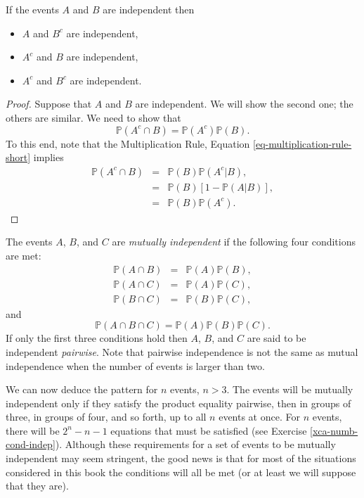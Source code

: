 \documentclass[captions=tableheading]{scrbook}
\begin{document}
\begin{prop}
If the events \(A\) and \(B\) are independent then
\begin{itemize}
\item \(A\) and \(B^{c}\) are independent,
\item \(A^{c}\) and \(B\) are independent,
\item \(A^{c}\) and \(B^{c}\) are independent.
\end{itemize}

\end{prop}

\begin{proof}
Suppose that \(A\) and \(B\) are independent. We will show the second one; the others are similar. We need to show that
\[
\mathbb{P}(A^{c}\cap B)=\mathbb{P}(A^{c})\mathbb{P}(B).
\]
To this end, note that the Multiplication Rule, Equation \ref{eq-multiplication-rule-short} implies 
\begin{eqnarray*}
\mathbb{P}(A^{c}\cap B) & = & \mathbb{P}(B)\mathbb{P}(A^{c}|B),\\
 & = & \mathbb{P}(B)[1-\mathbb{P}(A|B)],\\
 & = & \mathbb{P}(B)\mathbb{P}(A^{c}).
\end{eqnarray*}
\end{proof}

\begin{defn}
The events \(A\), \(B\), and \(C\) are \emph{mutually independent} if the following four conditions are met: 
\begin{eqnarray*}
\mathbb{P}(A\cap B) & = & \mathbb{P}(A)\mathbb{P}(B),\\
\mathbb{P}(A\cap C) & = & \mathbb{P}(A)\mathbb{P}(C),\\
\mathbb{P}(B\cap C) & = & \mathbb{P}(B)\mathbb{P}(C),
\end{eqnarray*}
and
\[
\mathbb{P}(A\cap B\cap C)=\mathbb{P}(A)\mathbb{P}(B)\mathbb{P}(C).
\]
If only the first three conditions hold then \(A\), \(B\), and \(C\) are said to be independent \emph{pairwise}. Note that pairwise independence is not the same as mutual independence when the number of events is larger than two.
\end{defn}

We can now deduce the pattern for \(n\) events, \(n>3\). The events will be mutually independent only if they satisfy the product equality pairwise, then in groups of three, in groups of four, and so forth, up to all \(n\) events at once. For \(n\) events, there will be \(2^{n}-n-1\) equations that must be satisfied (see Exercise \ref{xca-numb-cond-indep}). Although these requirements for a set of events to be mutually independent may seem stringent, the good news is that for most of the situations considered in this book the conditions will all be met (or at least we will suppose that they are).
\end{document}
